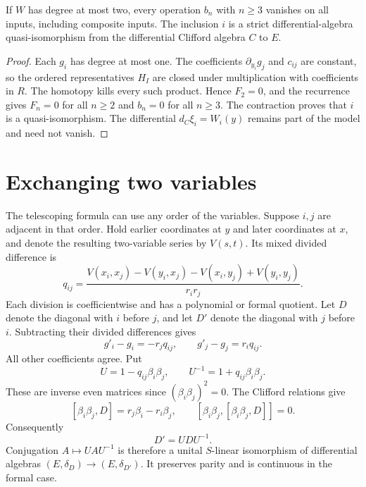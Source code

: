 \begin{corollary}\label{cor:ot-quadratic}
If \(W\) has degree at most two, every operation \(b_n\)
with \(n\ge3\) vanishes on all inputs, including composite
inputs. The inclusion \(i\) is a strict differential-algebra
quasi-isomorphism from the differential Clifford algebra \(C\)
to \(E\).
\end{corollary}

\begin{proof}
Each \(g_i\) has degree at most one. The coefficients
\(\partial_{y_i}g_j\) and \(c_{ij}\) are constant, so
the ordered representatives \(H_I\) are closed under
multiplication with coefficients in \(R\).
The homotopy kills every such product. Hence \(F_2=0\),
and the recurrence gives \(F_n=0\) for all \(n\ge2\) and
\(b_n=0\) for all \(n\ge3\).
The contraction proves that \(i\) is a quasi-isomorphism.
The differential \(d_C\xi_i=W_i(y)\) remains part of the
model and need not vanish.
\end{proof}

\section{Exchanging two variables}
\label{sec:ot-exchange}

The telescoping formula can use any order of the variables.
Suppose \(i,j\) are adjacent in that order. Hold earlier
coordinates at \(y\) and later coordinates at \(x\), and denote
the resulting two-variable series by \(V(s,t)\).
Its mixed divided difference is
\[
 q_{ij}=
 \frac{V(x_i,x_j)-V(y_i,x_j)-V(x_i,y_j)+V(y_i,y_j)}
      {r_i r_j}.
\]
Each division is coefficientwise and has a polynomial or formal
quotient. Let \(D\) denote the diagonal with \(i\) before \(j\),
and let \(D'\) denote the diagonal with \(j\) before \(i\).
Subtracting their divided differences gives
\[
 g'_i-g_i=-r_jq_{ij},\qquad
 g'_j-g_j=r_iq_{ij}.
\]
All other coefficients agree. Put
\[
 U=1-q_{ij}\beta_i\beta_j,\qquad U^{-1}=1+q_{ij}\beta_i\beta_j.
\]
These are inverse even matrices since \((\beta_i\beta_j)^2=0\).
The Clifford relations give
\[
 [\beta_i\beta_j,D]=r_j\beta_i-r_i\beta_j,\qquad
 [\beta_i\beta_j,[\beta_i\beta_j,D]]=0.
\]
Consequently
\begin{equation}\label{eq:ot-conjugation}
 D'=UDU^{-1}.
\end{equation}
Conjugation \(A\mapsto UAU^{-1}\) is therefore a unital
\(S\)-linear isomorphism of differential algebras
\((E,\delta_D)\to(E,\delta_{D'})\). It preserves parity
and is continuous in the formal case.

